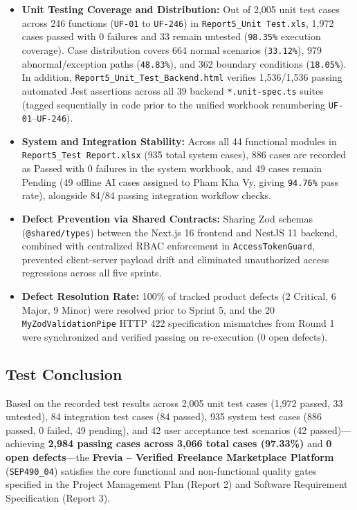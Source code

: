\documentclass[12pt,a4paper]{article}
\begin{document}
\begin{itemize}
  \item \textbf{Unit Testing Coverage and Distribution:} Out of 2,005 unit test cases across 246 functions (\texttt{UF-01} to \texttt{UF-246}) in \texttt{Report5\_Unit Test.xls}, 1,972 cases passed with 0 failures and 33 remain untested (\texttt{98.35\%} execution coverage). Case distribution covers 664 normal scenarios (\texttt{33.12\%}), 979 abnormal/exception paths (\texttt{48.83\%}), and 362 boundary conditions (\texttt{18.05\%}). In addition, \texttt{Report5\_Unit\_Test\_Backend.html} verifies 1,536/1,536 passing automated Jest assertions across all 39 backend \texttt{*.unit-spec.ts} suites (tagged sequentially in code prior to the unified workbook renumbering \texttt{UF-01}--\texttt{UF-246}).
  \item \textbf{System and Integration Stability:} Across all 44 functional modules in \texttt{Report5\_Test Report.xlsx} (935 total system cases), 886 cases are recorded as Passed with 0 failures in the system workbook, and 49 cases remain Pending (49 offline AI cases assigned to Pham Kha Vy, giving \texttt{94.76\%} pass rate), alongside 84/84 passing integration workflow checks.
  \item \textbf{Defect Prevention via Shared Contracts:} Sharing Zod schemas (\texttt{@shared/types}) between the Next.js 16 frontend and NestJS 11 backend, combined with centralized RBAC enforcement in \texttt{AccessTokenGuard}, prevented client-server payload drift and eliminated unauthorized access regressions across all five sprints.
  \item \textbf{Defect Resolution Rate:} 100\% of tracked product defects (2 Critical, 6 Major, 9 Minor) were resolved prior to Sprint 5, and the 20 \texttt{MyZodValidationPipe} HTTP 422 specification mismatches from Round 1 were synchronized and verified passing on re-execution (0 open defects).
\end{itemize}

\subsection{Test Conclusion}

Based on the recorded test results across 2,005 unit test cases (1,972 passed, 33 untested), 84 integration test cases (84 passed), 935 system test cases (886 passed, 0 failed, 49 pending), and 42 user acceptance test scenarios (42 passed)---achieving \textbf{2,984 passing cases across 3,066 total cases (97.33\%)} and \textbf{0 open defects}---the \textbf{Frevia -- Verified Freelance Marketplace Platform} (\texttt{SEP490\_04}) satisfies the core functional and non-functional quality gates specified in the Project Management Plan (Report 2) and Software Requirement Specification (Report 3).
\end{document}
